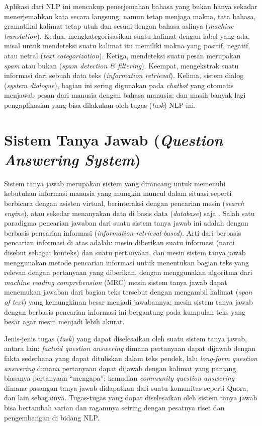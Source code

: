 Aplikasi dari NLP ini mencakup penerjemahan bahasa yang bukan hanya sekadar menerjemahkan kata secara langsung, namun tetap menjaga makna, tata bahasa, gramatikal kalimat tetap utuh dan sesuai dengan bahasa aslinya (\emph{machine translation}). Kedua, mengkategorisasikan suatu kalimat dengan label yang ada, misal untuk mendeteksi suatu kalimat itu memiliki makna yang positif, negatif, atau netral (\emph{text categorization}). Ketiga, mendeteksi suatu pesan merupakan \emph{spam} atau bukan (\emph{spam detection & filtering}). Keempat, mengekstrak suatu informasi dari sebuah data teks (\emph{information retrieval}). Kelima, sistem dialog (\emph{system dialogue}), bagian ini sering digunakan pada \emph{chatbot} yang otomatis menjawab pesan dari manusia dengan bahasa manusia; dan masih banyak lagi pengaplikasian yang bisa dilakukan oleh tugas (\emph{task}) NLP ini.

\section{Sistem Tanya Jawab (\emph{Question Answering System})}
Sistem tanya jawab merupakan sistem yang dirancang untuk memenuhi kebutuhan informasi manusia yang mungkin muncul dalam situasi seperti berbicara dengan asisten virtual, berinteraksi dengan pencarian mesin (\emph{search engine}), atau sekedar menanyakan data di basis data (\emph{database}) saja \citep{daniel2007speech}. Salah satu paradigma pencarian jawaban dari suatu sistem tanya jawab ini adalah dengan berbasis pencarian informasi (\emph{information-retrieval-based}). Arti dari berbasis pencarian informasi di atas adalah: mesin diberikan suatu informasi (nanti disebut sebagai konteks) dan suatu pertanyaan, dan mesin sistem tanya jawab menggunakan metode pencarian informasi untuk menentukan bagian teks yang relevan dengan pertanyaan yang diberikan, dengan menggunakan algoritma dari \emph{machine reading comprehension} (MRC) mesin sistem tanya jawab dapat menemukan jawaban dari bagian teks tersebut dengan mengambil kalimat (\emph{span of text}) yang kemungkinan besar menjadi jawabannya; mesin sistem tanya jawab dengan berbasis pencarian informasi ini bergantung pada kumpulan teks yang besar agar mesin menjadi lebih akurat. 

Jenis-jenis tugas (\emph{task}) yang dapat diselesaikan oleh suatu sistem tanya jawab, antara lain: \emph{factoid question answering} dimana pertanyaan dapat dijawab dengan fakta sederhana yang dapat dituliskan dalam teks pendek, lalu \emph{long-form question answering} dimana pertanyaan dapat dijawab dengan kalimat yang panjang, biasanya pertanyaan “mengapa”; kemudian \emph{community question answering} dimana pasangan tanya jawab didapatkan dari suatu komunitas seperti Quora, dan lain sebagainya. Tugas-tugas yang dapat diselesaikan oleh sistem tanya jawab bisa bertambah varian dan ragamnya seiring dengan pesatnya riset dan pengembangan di bidang NLP.
